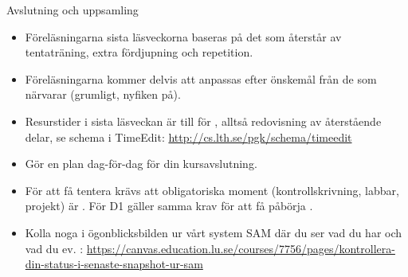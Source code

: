 \begin{SlideExtra}{Avslutning och uppsamling}

\begin{itemize}

\item Föreläsningarna sista läsveckorna baseras på det som återstår av tentaträning, extra fördjupning och repetition.

\item Föreläsningarna kommer delvis att anpassas efter önskemål från de som närvarar (grumligt, nyfiken på).

\item Resurstider i sista läsveckan är till för , alltså redovisning av återstående delar, se schema i TimeEdit: \url{http://cs.lth.se/pgk/schema/timeedit}

\item Gör en  plan dag-för-dag för din kursavslutning.

\item För att få tentera krävs att  obligatoriska moment (kontrollskrivning, labbar, projekt) är . För D1 gäller samma krav för att få påbörja .

\item Kolla noga i ögonblicksbilden ur vårt system SAM där du ser vad du har  och vad du ev. : \SlideFontTiny\url{https://canvas.education.lu.se/courses/7756/pages/kontrollera-din-status-i-senaste-snapshot-ur-sam}

\end{itemize}

\end{SlideExtra}


%
%

\fi